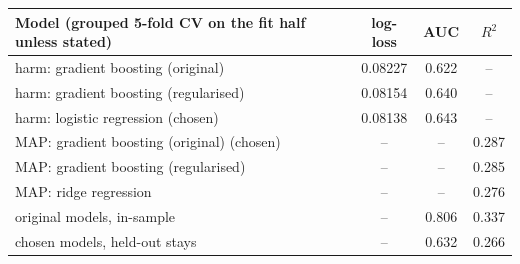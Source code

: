\begin{tabular}{lccc}
\toprule
Model (grouped 5-fold CV on the fit half unless stated) & log-loss & AUC & $R^2$ \\
\midrule
harm: gradient boosting (original) & 0.08227 & 0.622 & -- \\
harm: gradient boosting (regularised) & 0.08154 & 0.640 & -- \\
harm: logistic regression (chosen) & 0.08138 & 0.643 & -- \\
MAP: gradient boosting (original) (chosen) & -- & -- & 0.287 \\
MAP: gradient boosting (regularised) & -- & -- & 0.285 \\
MAP: ridge regression & -- & -- & 0.276 \\
original models, in-sample & -- & 0.806 & 0.337 \\
chosen models, held-out stays & -- & 0.632 & 0.266 \\
\bottomrule
\end{tabular}
